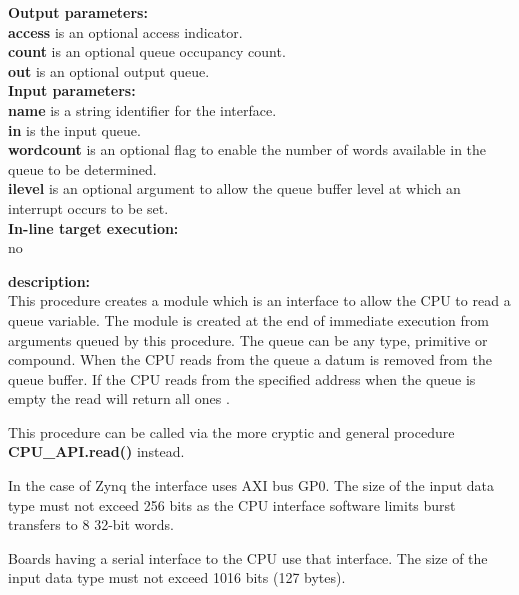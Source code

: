             {\bf Output parameters:} \\
            {\bf access} is an optional access indicator.\\        
            {\bf count} is an optional queue occupancy count.\\
            {\bf out} is an optional output queue.\\

            {\bf Input parameters:} \\            
            {\bf name} is a string identifier for the interface.\\
            {\bf in} is the input queue.\\            
            {\bf wordcount} is an optional flag to enable the number of words
            available in the queue to be determined.\\
            {\bf ilevel} is an optional argument to allow the queue buffer level
            at which an interrupt occurs to be set.\\
        
            {\bf In-line target execution:} \\
            no

            {\bf description:} \\
            This procedure creates a module which is an interface to allow the CPU
            to read a queue variable. The module is created at the end of immediate
            execution from arguments queued by this procedure. The queue can be any
            type, primitive or compound. When the CPU reads from the queue a datum
            is removed from the queue buffer. If the CPU reads from the specified
            address when the queue is empty the read will return all ones .
            
            This procedure can be called via the more cryptic and general
            procedure {\bf CPU\_API.read()}  instead.
            
            In the case of Zynq the interface uses AXI bus GP0.            
            The size of the input data type must not exceed 256 bits as the CPU
            interface software limits burst transfers to 8 32-bit words.
            
            Boards having a serial interface to the CPU use that interface.
            The size of the input data type must not exceed 1016 bits (127 bytes).

            

